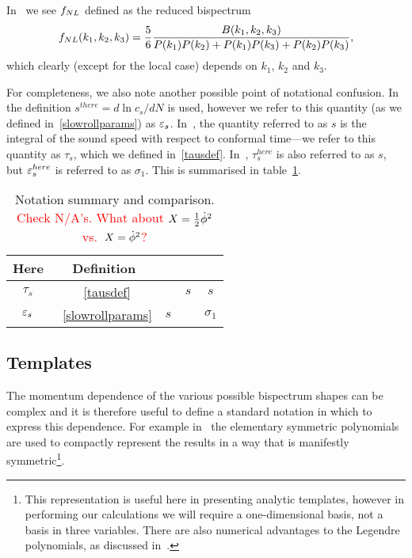     In~\cite{px_burrage, transport_main} we see $f_{NL}$ defined as the reduced bispectrum
    \begin{align}\label{transport_fnl_defn}
        f_{NL}(k_1,k_2,k_3) = \frac{5}{6}\frac{B(k_1,k_2,k_3)}{P(k_1)P(k_2)+P(k_1)P(k_3)+P(k_2)P(k_3)},
    \end{align}
    which clearly (except for the local case) depends on $k_1$, $k_2$ and $k_3$.


    For completeness, we also note another possible point of notational confusion.
    In~\cite{px_burrage} the definition $s^{there}=d\ln c_s/dN$ is used, however we refer to this
    quantity (as we defined in~\eqref{slowrollparams}) as $\varepsilon_{s}$.
    In~\cite{Hu_2011}, the quantity referred to as $s$ is the integral of the sound speed
    with respect to conformal time---we refer to this quantity as $\tau_s$,
    which we defined in~\eqref{tausdef}.
    In~\cite{warp_features_dbi}, $\tau_s^{here}$ is also referred to as $s$,
    but $\varepsilon_{s}^{here}$ is referred to as $\sigma_1$.
    This is summarised in table~\ref{tab:notation}.


\begin{table}[h!]
  \begin{center}
    \begin{tabular}{ccccc}
        \toprule
        Here & Definition &~\cite{px_burrage}&~\cite{Hu_2011} &~\cite{warp_features_dbi}\\
        \midrule
        $\tau_s$ &~\eqref{tausdef} & ~ & $s$ & $s$ \\
        $\varepsilon_{s}$ &~\eqref{slowrollparams} & $s$ & ~ & $\sigma_1$ \\
        \bottomrule
    \end{tabular}
    \caption{
        Notation summary and comparison.
        \textcolor{red}{Check N/A's. What about $X=\frac{1}{2}\dot{\phi}^2$ vs.\ $X=\dot{\phi}^2$?}
    }\label{tab:notation}
  \end{center}
\end{table}


    \subsection{Templates}
    The momentum dependence of the various possible bispectrum shapes can be complex
    and it is therefore useful to define a standard notation in which to express this dependence.
    For example in~\cite{Fergusson_2010, Pajer_boostless_2020} the elementary
    symmetric polynomials are used to compactly represent the results in a way that is manifestly
    symmetric\footnote{This representation is useful here in presenting analytic templates, however in performing
    our calculations we will require a one-dimensional basis, not a basis in three variables.
    There are also numerical advantages to the Legendre polynomials, as discussed in~\cite{Fergusson_2010}.}.


